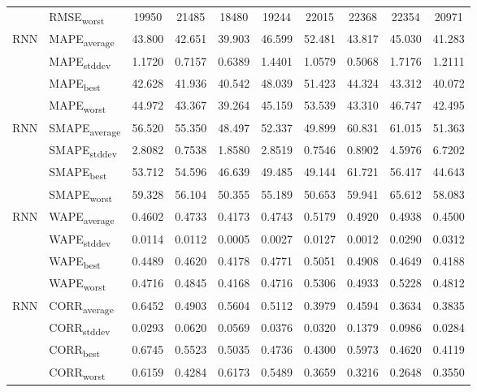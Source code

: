 {\begin{longtable}{l l c c c c c c c c}
 & RMSE\textsubscript{worst} & 19950 & 21485 & 18480 & 19244 & 22015 & 22368 & 22354 & 20971 \\
\cmidrule(lr){2-10}
\multirow{4}{*}{RNN} & MAPE\textsubscript{average} & 43.800 & 42.651 & 39.903 & 46.599 & 52.481 & 43.817 & 45.030 & 41.283 \\
 & MAPE\textsubscript{stddev} & 1.1720 & 0.7157 & 0.6389 & 1.4401 & 1.0579 & 0.5068 & 1.7176 & 1.2111 \\
 & MAPE\textsubscript{best} & 42.628 & 41.936 & 40.542 & 48.039 & 51.423 & 44.324 & 43.312 & 40.072 \\
 & MAPE\textsubscript{worst} & 44.972 & 43.367 & 39.264 & 45.159 & 53.539 & 43.310 & 46.747 & 42.495 \\
\cmidrule(lr){2-10}
\multirow{4}{*}{RNN} & SMAPE\textsubscript{average} & 56.520 & 55.350 & 48.497 & 52.337 & 49.899 & 60.831 & 61.015 & 51.363 \\
 & SMAPE\textsubscript{stddev} & 2.8082 & 0.7538 & 1.8580 & 2.8519 & 0.7546 & 0.8902 & 4.5976 & 6.7202 \\
 & SMAPE\textsubscript{best} & 53.712 & 54.596 & 46.639 & 49.485 & 49.144 & 61.721 & 56.417 & 44.643 \\
 & SMAPE\textsubscript{worst} & 59.328 & 56.104 & 50.355 & 55.189 & 50.653 & 59.941 & 65.612 & 58.083 \\
\cmidrule(lr){2-10}
\multirow{4}{*}{RNN} & WAPE\textsubscript{average} & 0.4602 & 0.4733 & 0.4173 & 0.4743 & 0.5179 & 0.4920 & 0.4938 & 0.4500 \\
 & WAPE\textsubscript{stddev} & 0.0114 & 0.0112 & 0.0005 & 0.0027 & 0.0127 & 0.0012 & 0.0290 & 0.0312 \\
 & WAPE\textsubscript{best} & 0.4489 & 0.4620 & 0.4178 & 0.4771 & 0.5051 & 0.4908 & 0.4649 & 0.4188 \\
 & WAPE\textsubscript{worst} & 0.4716 & 0.4845 & 0.4168 & 0.4716 & 0.5306 & 0.4933 & 0.5228 & 0.4812 \\
\cmidrule(lr){2-10}
\multirow{4}{*}{RNN} & CORR\textsubscript{average} & 0.6452 & 0.4903 & 0.5604 & 0.5112 & 0.3979 & 0.4594 & 0.3634 & 0.3835 \\
 & CORR\textsubscript{stddev} & 0.0293 & 0.0620 & 0.0569 & 0.0376 & 0.0320 & 0.1379 & 0.0986 & 0.0284 \\
 & CORR\textsubscript{best} & 0.6745 & 0.5523 & 0.5035 & 0.4736 & 0.4300 & 0.5973 & 0.4620 & 0.4119 \\
 & CORR\textsubscript{worst} & 0.6159 & 0.4284 & 0.6173 & 0.5489 & 0.3659 & 0.3216 & 0.2648 & 0.3550 \\

\end{longtable}}
